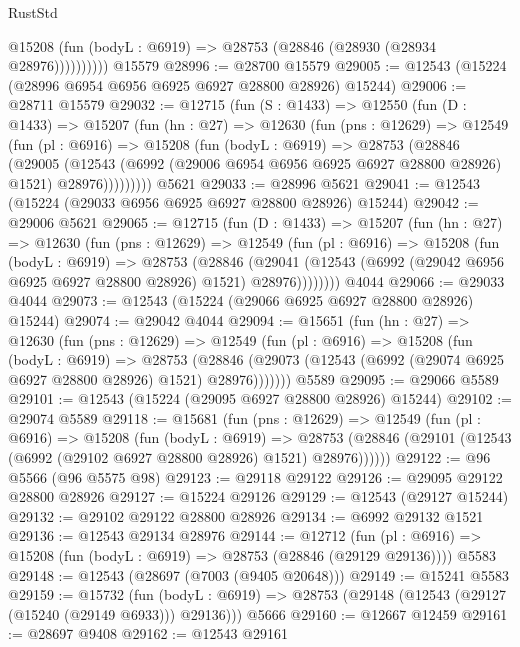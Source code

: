 \begin{lexlean}{RustStd}
\begin{coremodule}
              @15208 (fun (bodyL : @6919) => @28753 (@28846 (@28930 (@28934 @28976))))))))))
    @15579
@28996 := @28700 @15579
@29005 := @12543 (@15224 (@28996 @6954 @6956 @6925 @6927 @28800 @28926) @15244)
@29006 := @28711 @15579
@29032 := @12715
    (fun (S : @1433) =>
    @12550
      (fun (D : @1433) =>
      @15207
        (fun (hn : @27) =>
        @12630
          (fun (pns : @12629) =>
          @12549
            (fun (pl : @6916) =>
            @15208
              (fun (bodyL : @6919) =>
              @28753
                (@28846
                  (@29005
                    (@12543
                      (@6992 (@29006 @6954 @6956 @6925 @6927 @28800 @28926) @1521)
                      @28976)))))))))
    @5621
@29033 := @28996 @5621
@29041 := @12543 (@15224 (@29033 @6956 @6925 @6927 @28800 @28926) @15244)
@29042 := @29006 @5621
@29065 := @12715
    (fun (D : @1433) =>
    @15207
      (fun (hn : @27) =>
      @12630
        (fun (pns : @12629) =>
        @12549
          (fun (pl : @6916) =>
          @15208
            (fun (bodyL : @6919) =>
            @28753
              (@28846
                (@29041
                  (@12543 (@6992 (@29042 @6956 @6925 @6927 @28800 @28926) @1521) @28976))))))))
    @4044
@29066 := @29033 @4044
@29073 := @12543 (@15224 (@29066 @6925 @6927 @28800 @28926) @15244)
@29074 := @29042 @4044
@29094 := @15651
    (fun (hn : @27) =>
    @12630
      (fun (pns : @12629) =>
      @12549
        (fun (pl : @6916) =>
        @15208
          (fun (bodyL : @6919) =>
          @28753
            (@28846 (@29073 (@12543 (@6992 (@29074 @6925 @6927 @28800 @28926) @1521) @28976)))))))
    @5589
@29095 := @29066 @5589
@29101 := @12543 (@15224 (@29095 @6927 @28800 @28926) @15244)
@29102 := @29074 @5589
@29118 := @15681
    (fun (pns : @12629) =>
    @12549
      (fun (pl : @6916) =>
      @15208
        (fun (bodyL : @6919) =>
        @28753 (@28846 (@29101 (@12543 (@6992 (@29102 @6927 @28800 @28926) @1521) @28976))))))
@29122 := @96 @5566 (@96 @5575 @98)
@29123 := @29118 @29122
@29126 := @29095 @29122 @28800 @28926
@29127 := @15224 @29126
@29129 := @12543 (@29127 @15244)
@29132 := @29102 @29122 @28800 @28926
@29134 := @6992 @29132 @1521
@29136 := @12543 @29134 @28976
@29144 := @12712
    (fun (pl : @6916) => @15208 (fun (bodyL : @6919) => @28753 (@28846 (@29129 @29136))))
    @5583
@29148 := @12543 (@28697 (@7003 (@9405 @20648)))
@29149 := @15241 @5583
@29159 := @15732
    (fun (bodyL : @6919) => @28753 (@29148 (@12543 (@29127 (@15240 (@29149 @6933))) @29136)))
    @5666
@29160 := @12667 @12459
@29161 := @28697 @9408
@29162 := @12543 @29161

\end{coremodule}
\end{lexlean}
